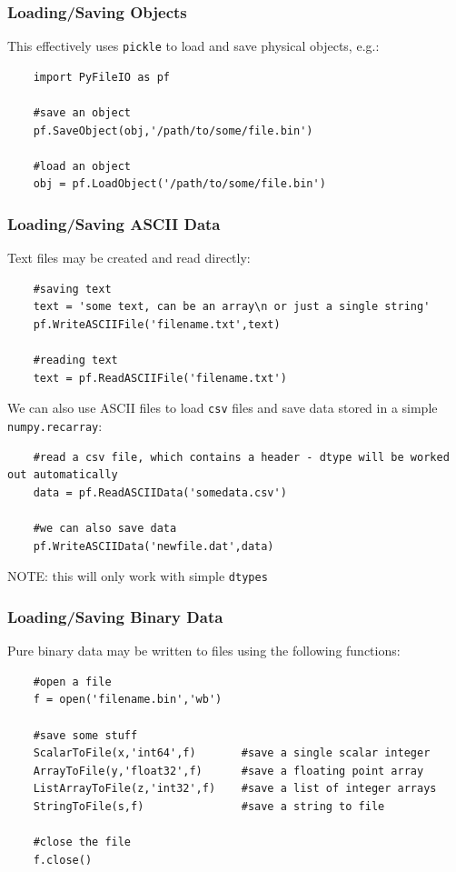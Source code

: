 	\subsubsection{Loading/Saving Objects}
	
	This effectively uses \texttt{pickle} to load and save physical objects, e.g.:
	
	\begin{verbatim}
	import PyFileIO as pf
	
	#save an object
	pf.SaveObject(obj,'/path/to/some/file.bin')
	
	#load an object
	obj = pf.LoadObject('/path/to/some/file.bin')
	\end{verbatim}
	
	\subsubsection{Loading/Saving ASCII Data}
	
	Text files may be created and read directly:
	
	\begin{verbatim}
	#saving text
	text = 'some text, can be an array\n or just a single string'
	pf.WriteASCIIFile('filename.txt',text)
	
	#reading text
	text = pf.ReadASCIIFile('filename.txt')
	\end{verbatim}
	
	We can also use ASCII files to load \texttt{csv} files and save data stored in a simple \texttt{numpy.recarray}:
	
	\begin{verbatim}
	#read a csv file, which contains a header - dtype will be worked out automatically
	data = pf.ReadASCIIData('somedata.csv')
	
	#we can also save data
	pf.WriteASCIIData('newfile.dat',data)
	\end{verbatim}
	
	NOTE: this will only work with simple \texttt{dtypes}
	
	\subsubsection{Loading/Saving Binary Data}
	
	Pure binary data may be written to files using the following functions:
	
	\begin{verbatim}
	#open a file
	f = open('filename.bin','wb')
	
	#save some stuff
	ScalarToFile(x,'int64',f)       #save a single scalar integer
	ArrayToFile(y,'float32',f)      #save a floating point array
	ListArrayToFile(z,'int32',f)    #save a list of integer arrays
	StringToFile(s,f)               #save a string to file
	
	#close the file
	f.close()
	\end{verbatim}
	
